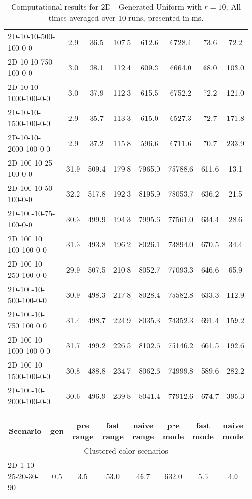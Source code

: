 \documentclass{article}
\begin{document}
\begin{center}
\begin{table}[h]
\begin{tabular}{|l||c|c|c|c|c|c|c|}
    2D-10-10-500-100-0-0 & 2.9 & 36.5 & 107.5 & 612.6 & 6728.4 & 73.6 & 72.2 \\
    2D-10-10-750-100-0-0 & 3.0 & 38.1 & 112.4 & 609.3 & 6664.0 & 68.0 & 103.0 \\
    2D-10-10-1000-100-0-0 & 3.0 & 37.9 & 112.3 & 615.5 & 6752.2 & 72.2 & 121.0 \\
    2D-10-10-1500-100-0-0 & 2.9 & 35.7 & 113.3 & 615.0 & 6527.3 & 72.7 & 171.8 \\
    2D-10-10-2000-100-0-0 & 2.9 & 37.2 & 115.8 & 596.6 & 6711.6 & 70.7 & 233.9 \\
    \hline
    2D-100-10-25-100-0-0 & 31.9 & 509.4 & 179.8 & 7965.0 & 75788.6 & 611.6 & 13.1 \\
    2D-100-10-50-100-0-0 & 32.2 & 517.8 & 192.3 & 8195.9 & 78053.7 & 636.2 & 21.5 \\
    2D-100-10-75-100-0-0 & 30.3 & 499.9 & 194.3 & 7995.6 & 77561.0 & 634.4 & 28.6 \\
    2D-100-10-100-100-0-0 & 31.3 & 493.8 & 196.2 & 8026.1 & 73894.0 & 670.5 & 34.4 \\
    2D-100-10-250-100-0-0 & 29.9 & 507.5 & 210.8 & 8052.7 & 77093.3 & 646.6 & 65.9 \\
    2D-100-10-500-100-0-0 & 30.9 & 498.3 & 217.8 & 8028.4 & 75582.8 & 633.3 & 112.9 \\
    2D-100-10-750-100-0-0 & 31.4 & 498.7 & 224.9 & 8035.3 & 74352.3 & 691.4 & 159.2 \\
    2D-100-10-1000-100-0-0 & 31.7 & 499.2 & 226.5 & 8102.6 & 75146.2 & 661.5 & 192.6 \\
    2D-100-10-1500-100-0-0 & 30.8 & 488.8 & 234.7 & 8062.6 & 74999.8 & 589.6 & 282.2 \\
    2D-100-10-2000-100-0-0 & 30.6 & 496.9 & 239.8 & 8041.4 & 77912.6 & 674.7 & 395.3 \\
    \hline
    \end{tabular}
    \caption{Computational results for 2D - Generated Uniform with $r=10$. All times averaged over 10 runs, presented in ms.}
\end{table}
\begin{table}[h]
    \hskip0.8cm
    \begin{tabular}{|l||c|c|c|c|c|c|c|}
    \hline
    \multicolumn{1}{|c|}{Scenario} & gen & pre range & fast range & naive range & pre mode & fast mode & naive mode  \\
    \hline
    \hline
    \multicolumn{8}{|c|}{Clustered color scenarios} \\
    \hline
    2D-1-10-25-20-30-90 & 0.5 & 3.5 & 53.0 & 46.7 & 632.0 & 5.6 & 4.0 \\

\end{tabular}
\end{table}
\end{center}
\end{document}
